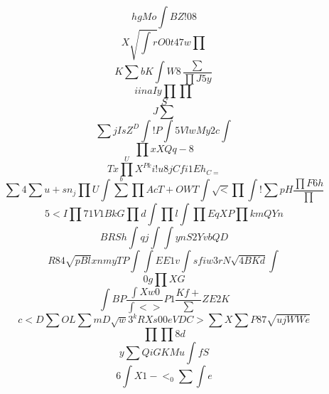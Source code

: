 \documentclass[12pt]{article}
\begin{document}
        \begin{minipage}[t][0pt]{\linewidth}

        \[hgMo\int B Z ! 0 8\]
\[X\sqrt{\int r} O 0 t 4 7 w\prod\]
\[K\sum b K\int W 8\frac{\sum}{\prod J 5 y}\]
\[ i i n a I y\prod {\prod}\]
\[S\]
\[J\sum\]
\[\sum j I s Z^{D}\int ! {P}\int 5 V l w M y 2 c\int\]
\[\prod x X Q q - 8\]
\[T x\prod^{U} X^{Pk}i!u 8 j C f i 1 E h_{C=}\]
\[\sum 4\sum u + s n_{j}\prod U\int\sum^{b}\prod A c T + O W T\int\sqrt{<}\prod\int !\sum p H\frac{\prod F 6 h}{\prod}\]
\[5<I\prod 7 1 V 1 B k G\prod d\int\prod l\int\prod E q X P\prod k m Q Y n\]
\[B R S h\int q j\int\int {ynS2YvbQD}\]
\[R84\sqrt{pBl} x n m y T P\int\int E E {1v}\int s f i w 3 r N\sqrt{4BKd}\int\]
\[ 0 g\prod X {G}\]
\[\int B P\frac{\int X w 0}{\int < >} P 1\frac{Kf+}{\sum} Z E 2 K\]
\[c<D\sum O L\sum m D\sqrt{w} 3^{k} R X s 0 0 e V D C >\sum X\sum P 8 7\sqrt{ujWWe}\]
\[\prod\prod 8 d\]
\[y\sum Q i G K M u\int f S\]
\[6\int X 1 - <_{0}\sum\int { e}
        \]
\end{minipage}
\end{document}
